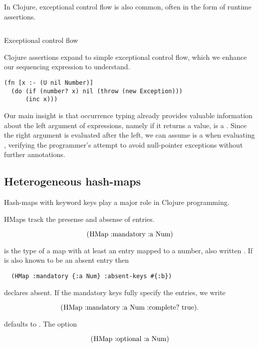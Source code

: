 In Clojure, exceptional control flow is also common, often in the form of
runtime assertions. 


\begin{listing}
\inputminted[firstline=5,lastline=7]{clojure}{code/demo/src/demo/do.clj}
\caption{Exceptional control flow}
\end{listing}

Clojure assertions expand to simple exceptional control flow,
which we enhance our sequencing \doliteral{} expression to understand.

\begin{verbatim}
(fn [x :- (U nil Number)]
  (do (if (number? x) nil (throw (new Exception)))
      (inc x)))
\end{verbatim}

Our main insight is that occurrence typing already provides
valuable information about the left argument of \doliteral{} expressions,
namely if it returns a value,  is a .
Since the right argument is evaluated after the left, we can assume
 is a  when evaluating , verifying
the programmer's attempt to avoid null-pointer exceptions without further annotations.

\subsection{Heterogeneous hash-maps}

Hash-maps with keyword keys play a major role in Clojure programming.

HMaps track the presense and absense of entries.

$$
\clj{(HMap :mandatory {:a Num})} 
$$

is the type of a map with at least an  entry mapped to a number,
also written . If  is also known to be an absent entry
then

\smallskip
\begin{verbatim}
  (HMap :mandatory {:a Num} :absent-keys #{:b})
\end{verbatim}

declares  absent. If the mandatory keys fully specify the
entries, we write

$$
\clj{(HMap :mandatory {:a Num} :complete? true)}.
$$

 defaults to .
The  option 

$$
\clj{(HMap :optional {:a Num})}
$$

